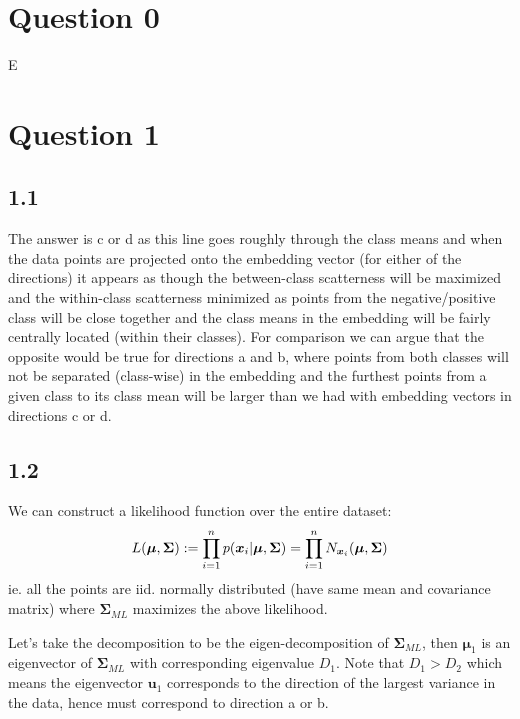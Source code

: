 \section*{Question 0}
E

\section*{Question 1}

\subsection*{1.1}
The answer is c or d as this line goes roughly through the class means and when the data points are projected onto the embedding vector (for either of the directions) it appears as though the between-class scatterness will be maximized and the within-class scatterness minimized as points from the negative/positive class will be close together and the class means in the embedding will be fairly centrally located (within their classes). For comparison we can argue that the opposite would be true for directions a and b, where points from both classes will not be separated (class-wise) in the embedding and the furthest points from a given class to its class mean will be larger than we had with embedding vectors in directions c or d. 

\subsection*{1.2}
We can construct a likelihood function over the entire dataset:
\begin{equation}
    L(\bm{\mu},\bm{\Sigma}) := \prod_{i=1}^{n} p({\bm{x}_{i}} | \bm{\mu}, \bm{\Sigma}) = \prod_{i=1}^{n} N_{{\bm{x}_{i}}}(\bm{\mu},\bm{\Sigma})
\end{equation}
ie. all the points are iid. normally distributed (have same mean and covariance matrix) where $\bm{\Sigma}_{ML}$ maximizes the above likelihood.

Let's take the decomposition to be the eigen-decomposition of $\bm{\Sigma}_{ML}$, then $\bm{\mu}_{1}$ is an eigenvector of $\bm{\Sigma}_{ML}$ with corresponding eigenvalue $D_{1}$. Note that $D_{1} > D_{2}$ which means the eigenvector $\bm{u}_{1}$ corresponds to the direction of the largest variance in the data, hence must correspond to direction a or b. 

